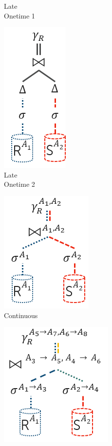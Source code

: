 \begin{figure}
\begin{subfigure}[b]{1.5cm}
		\caption{Late\\Onetime 1}
		\label{fig:QueryProcessing:late1}
	\end{subfigure}
	\hfill
	\begin{subfigure}[b]{1.5cm}
		\centering
		\includegraphics[scale=0.6]{figures/QP-Late2.png}
		\caption{Late\\Onetime 2}
		\label{fig:QueryProcessing:late2}
	\end{subfigure}
	\hfill
	\begin{subfigure}[b]{2cm}
		\centering
		\includegraphics[scale=0.6]{figures/QP-Continuous.png}
		\caption{Continuous \phantom{Onetime}}
		\label{fig:QueryProcessing:continuous}
	\end{subfigure}
	\hfill
	\begin{subfigure}[b]{2.5cm}
		\centering
		\includegraphics[scale=0.6]{figures/QP-Continuous-Reencoding.png}

\end{subfigure}
\end{figure}

